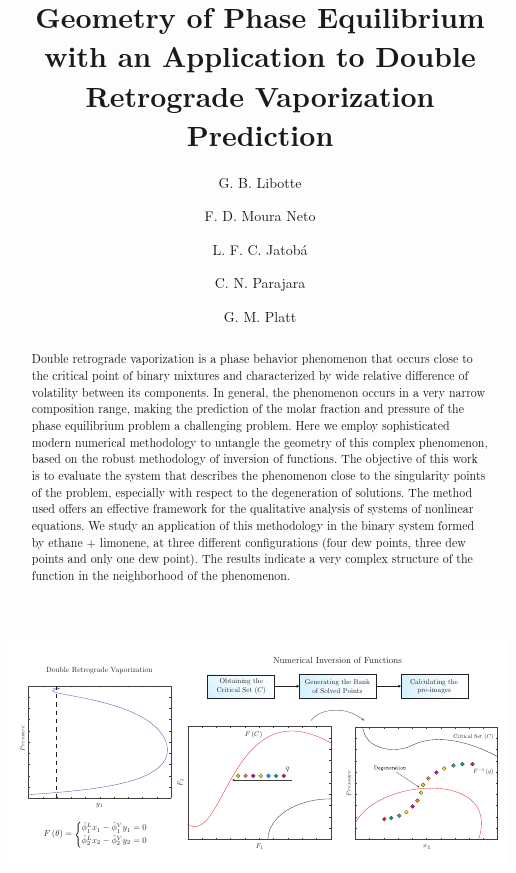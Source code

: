 \documentclass[journal=iecred,manuscript=article]{achemso}
\author{G. B. Libotte}
\author{F. D. Moura Neto}
\author{L. F. C. Jatob\'{a}}
\author{C. N. Parajara}
\author{G. M. Platt}
\affiliation[Unknown University]
{Polytechnic Institute, Rio de Janeiro State University, Nova Friburgo, Brazil}
\title[An \textsf{achemso} demo]
  {Geometry of Phase Equilibrium with an Application to Double Retrograde Vaporization Prediction}
\theoremstyle{definition}
\theoremstyle{remark}
\begin{document}
\begin{tocentry}

		\includegraphics[scale=1]{graphical_abstract/graphical_abstract.pdf}

\end{tocentry}

\begin{abstract}
Double retrograde vaporization is a phase behavior phenomenon that occurs close to the critical point of binary mixtures and characterized by wide relative difference of volatility between its components. In general, the phenomenon occurs in a very narrow composition range, making the prediction of the molar fraction and pressure of the phase equilibrium problem a challenging problem. Here we employ sophisticated modern numerical methodology to untangle the geometry of this complex phenomenon, based on the robust methodology of inversion of functions. The objective of this work is to evaluate the system that describes the phenomenon close to the singularity points of the problem, especially with respect to the degeneration of solutions. The method used offers an effective framework for the qualitative analysis of systems of nonlinear equations. We study an application of this methodology in the binary system formed by ethane + limonene, at three different configurations (four dew points, three dew points and only one dew point). The results indicate a very complex structure of the function in the neighborhood of the phenomenon.
\end{abstract}
\end{document}
